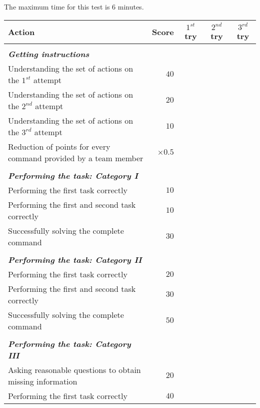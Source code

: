 The maximum time for this test is 6 minutes.

\begin{tabularx}{\textwidth}{X r c c c }

	\textbf{Action} & \textbf{Score} & \textbf{$1^{st}$ try} & \textbf{$2^{nd}$ try} & \textbf{$3^{rd}$ try} \\ \hline
	& & & & \\ 
	\textit{\textbf{Getting instructions}} \\
	Understanding the set of actions on the $1^{st}$ attempt & $40$ & \hrulefill & \hrulefill & \hrulefill \\
	Understanding the set of actions on the $2^{nd}$ attempt & $20$ & \hrulefill & \hrulefill & \hrulefill \\
	Understanding the set of actions on the $3^{rd}$ attempt & $10$ & \hrulefill & \hrulefill & \hrulefill \\
	Reduction of points for every command provided by a team member & $\times 0.5$ & \hrulefill & \hrulefill & \hrulefill \\
	& & & & \\ 
	\textit{\textbf{Performing the task: Category I}} \\
	Performing the first task correctly & $10$ & \hrulefill & \hrulefill & \hrulefill \\
	Performing the first and second task correctly & $10$ & \hrulefill & \hrulefill & \hrulefill \\
	Successfully solving the complete command & $30$ & \hrulefill & \hrulefill & \hrulefill \\
	& & & & \\ 
	\textit{\textbf{Performing the task: Category II}} \\
	Performing the first task correctly & $20$ & \hrulefill & \hrulefill & \hrulefill \\
	Performing the first and second task correctly & $30$ & \hrulefill & \hrulefill & \hrulefill \\
	Successfully solving the complete command & $50$ & \hrulefill & \hrulefill & \hrulefill \\
	& & & & \\ 
	\textit{\textbf{Performing the task: Category III}} \\
	Asking reasonable questions to obtain missing information & $20$ & \hrulefill & \hrulefill & \hrulefill \\
	Performing the first task correctly & $40$ & \hrulefill & \hrulefill & \hrulefill \\

\end{tabularx}
